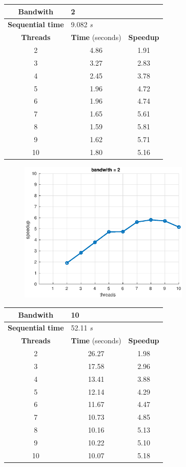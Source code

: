 \documentclass[10pt,twocolumn,letterpaper]{article}
\begin{document}
\begin{table}[H]
\centering
\begin{tabular}{ccc}
\hline
\textbf{Bandwith} & \multicolumn{2}{l}{2} \\
\hline
\textbf{Sequential time} & \multicolumn{2}{l}{9.082 \textit{s}} \\
\hline
\textbf{Threads} & \textbf{Time} (seconds) & \textbf{Speedup} \\
\hline
2 & 4.86  & 1.91 \\
3 & 3.27 & 2.83 \\
4 & 2.45 & 3.78 \\
5 & 1.96 & 4.72 \\
6 & 1.96 & 4.74 \\
7 & 1.65 & 5.61 \\
8 & 1.59 & 5.81 \\
9 & 1.62 & 5.71 \\
10 & 1.80 & 5.16 \\
\hline
\end{tabular}
\end{table}

\begin{figure}[H]
\centering
\includegraphics[width=3.2in]{fig/speedup2b.eps}
\end{figure}

\begin{table}[H]
\centering
\begin{tabular}{ccc}
\hline
\textbf{Bandwith} & \multicolumn{2}{l}{10} \\
\hline
\textbf{Sequential time} & \multicolumn{2}{l}{52.11 \textit{s}} \\
\hline
\textbf{Threads} & \textbf{Time} (seconds) & \textbf{Speedup} \\
\hline
2 & 26.27 & 1.98 \\
3 & 17.58 & 2.96 \\
4 & 13.41 & 3.88 \\
5 & 12.14 & 4.29 \\
6 & 11.67 & 4.47 \\
7 & 10.73 & 4.85 \\
8 & 10.16 & 5.13 \\
9 & 10.22 & 5.10 \\
10 & 10.07 & 5.18 \\
\hline
\end{tabular}
\end{table}
\end{document}
